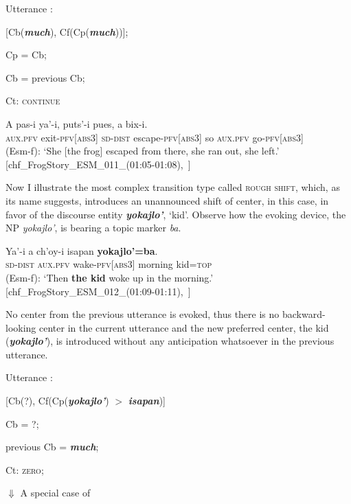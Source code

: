 \documentclass[output=paper
,modfonts
,nonflat]{langsci/langscibook}
\begin{document}
\ea
Utterance :

[Cb(\textbf{\textit{much}}), Cf(Cp(\textbf{\textit{much}}))];

Cp = Cb;

Cb = previous Cb;

Ct: \textsc{continue}
\z



\ea \label{ex:pico:19}

\gll   A pas-i ya'-i, puts'-i  pues, a bix-i.\\
{\textsc{aux.pfv}} exit-{\textsc{pfv[abs3]}} {\textsc{sd-dist}} escape-{\textsc{pfv[abs3]}} so {\textsc{aux.pfv}} go-{\textsc{pfv[abs3]}}\\

\glt (Esm-f): `She [the frog] escaped from there, she ran out, she left.' [chf\_FrogStory\_ESM\_011\_(01:05-01:08),~\citealt{Delgado-Galvan2018archive}]
\z


Now I illustrate the most complex transition type called \textsc{rough shift}, which, as its name suggests, introduces an unannounced shift of center, in this case, in favor of the discourse entity \textbf{\textit{yokajlo'}}, `kid'. Observe how the evoking device, the NP \textit{yokajlo'}, is bearing a topic marker \textit{ba}.

\ea \label{ex:pico:15}

\gll   Ya'-i a ch'oy-i isapan \textbf{yokajlo'=ba}.\\
{\textsc{sd-dist}} {\textsc{aux.pfv}} wake-{\textsc{pfv[abs3]}} morning kid={\textsc{top}}\\
\glt (Esm-f): `Then \textbf{the kid} woke up in the morning.' 
[chf\_FrogStory\_ESM\_012\_(01:09-01:11),~\citealt{Delgado-Galvan2018archive}]
\z

No center from the previous utterance is evoked, thus there is no backward-looking center in the current utterance and the new preferred center, the kid (\textbf{\textit{yokajlo'}}), is introduced without any anticipation whatsoever in the previous utterance.

\ea
Utterance :

[Cb(?), Cf(Cp(\textbf{\textit{yokajlo'}}) $>$ \textbf{\textit{isapan}})]

Cb = ?;

previous Cb = \textbf{\textit{much}};

Ct: \textsc{zero}; 



$\Downarrow$ A special case of
\end{document}
